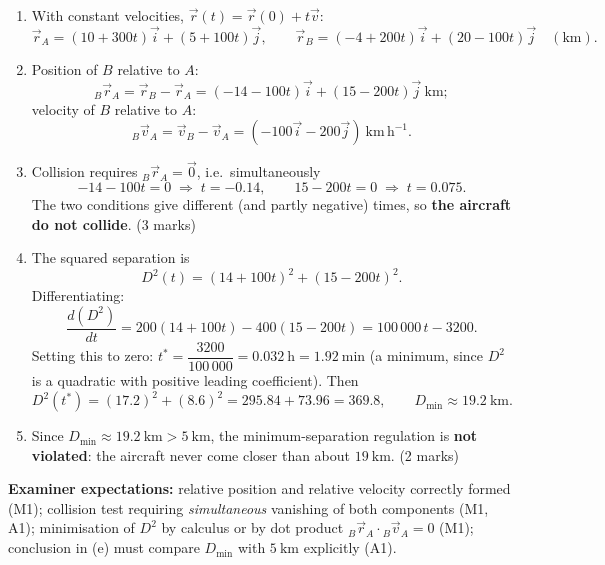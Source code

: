 \documentclass[11pt]{article}
\begin{document}
\begin{corrige}
\begin{enumerate}
\item With constant velocities, $\vec{r}(t) = \vec{r}(0) + t\vec{v}$:
\[
\vec{r}_A = (10 + 300t)\vec{i} + (5 + 100t)\vec{j}, \qquad
\vec{r}_B = (-4 + 200t)\vec{i} + (20 - 100t)\vec{j} \quad (\mathrm{km}). \tag{2 marks}
\]
\item Position of $B$ relative to $A$:
\[
{}_B\vec{r}_A = \vec{r}_B - \vec{r}_A = (-14 - 100t)\vec{i} + (15 - 200t)\vec{j}\ \mathrm{km};
\]
velocity of $B$ relative to $A$:
\[
{}_B\vec{v}_A = \vec{v}_B - \vec{v}_A = (-100\vec{i} - 200\vec{j})\ \mathrm{km\,h^{-1}}. \tag{3 marks}
\]
\item Collision requires ${}_B\vec{r}_A = \vec{0}$, i.e.\ simultaneously
\[
-14 - 100t = 0 \;\Rightarrow\; t = -0.14, \qquad 15 - 200t = 0 \;\Rightarrow\; t = 0.075.
\]
The two conditions give different (and partly negative) times, so \textbf{the aircraft do not collide}. \hfill (3 marks)
\item The squared separation is
\[
D^2(t) = (14 + 100t)^2 + (15 - 200t)^2.
\]
Differentiating:
\[
\frac{d(D^2)}{dt} = 200(14 + 100t) - 400(15 - 200t) = 100\,000\,t - 3200.
\]
Setting this to zero: $t^\ast = \dfrac{3200}{100\,000} = 0.032\ \mathrm{h} = 1.92\ \mathrm{min}$ (a minimum, since $D^2$ is a quadratic with positive leading coefficient). Then
\[
D^2(t^\ast) = (17.2)^2 + (8.6)^2 = 295.84 + 73.96 = 369.8,
\qquad D_{\min} \approx 19.2\ \mathrm{km}. \tag{4 marks}
\]
\item Since $D_{\min} \approx 19.2\ \mathrm{km} > 5\ \mathrm{km}$, the minimum-separation regulation is \textbf{not violated}: the aircraft never come closer than about $19\ \mathrm{km}$. \hfill (2 marks)
\end{enumerate}
\textbf{Examiner expectations:} relative position and relative velocity correctly formed (M1); collision test requiring \emph{simultaneous} vanishing of both components (M1, A1); minimisation of $D^2$ by calculus or by dot product ${}_B\vec{r}_A \cdot {}_B\vec{v}_A = 0$ (M1); conclusion in (e) must compare $D_{\min}$ with $5\ \mathrm{km}$ explicitly (A1).
\end{corrige}
\end{document}
